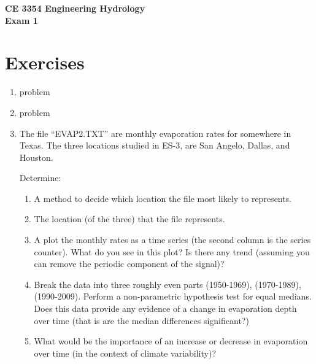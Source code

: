 \documentclass[12pt]{article}
\begin{document}
\begin{center}
{\textbf{{ CE 3354 Engineering Hydrology} \\ {Exam 1}}}
\end{center}

 \section*{\small{Exercises}}
 \begin{enumerate}

\item problem

\item problem

\item The file ``EVAP2.TXT'' are monthly evaporation rates for somewhere in Texas.  The three locations studied in ES-3, are San Angelo, Dallas, and Houston.

Determine:
\begin{enumerate}
\item A method to decide which location the file most likely to represents.
\item The location (of the three) that the file represents.
\item A plot the monthly rates as a time series (the second column is the series counter).  What do you see in this plot?   Is there any trend (assuming you can remove the periodic component of the signal)?
\item Break the data into three roughly even parts (1950-1969), (1970-1989),(1990-2009).  Perform a non-parametric hypothesis test for equal medians.  Does this data provide any evidence of a change in evaporation depth over time (that is are the median differences significant?)
\item What would be the importance of an increase or decrease in evaporation over time (in the context of climate variability)?
\end{enumerate}

\end{enumerate}
\end{document}
